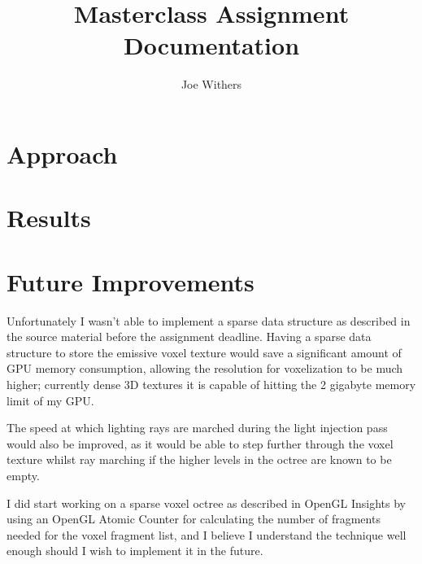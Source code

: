 \documentclass[11pt]{article}
\title{\textbf{Masterclass Assignment Documentation}}
\author{Joe Withers}
\date{}
\begin{document}
\maketitle

\section{Approach}

\section{Results}

\section{Future Improvements}

Unfortunately I wasn't able to implement a sparse data structure as described in the source material\cite{crassin_neyret_sainz_green_eisemann_2011} before the assignment deadline. Having a sparse data structure to store the emissive voxel texture would save a significant amount of GPU memory consumption, allowing the resolution for voxelization to be much higher; currently dense 3D textures it is capable of hitting the 2 gigabyte memory limit of my GPU.

The speed at which lighting rays are marched during the light injection pass would also be improved, as it would be able to step further through the voxel texture whilst ray marching if the higher levels in the octree are known to be empty.

I did start working on a sparse voxel octree as described in OpenGL Insights\cite{crassin_green_2012} by using an OpenGL Atomic Counter for calculating the number of fragments needed for the voxel fragment list, and I believe I understand the technique well enough should I wish to implement it in the future.



\end{document}
